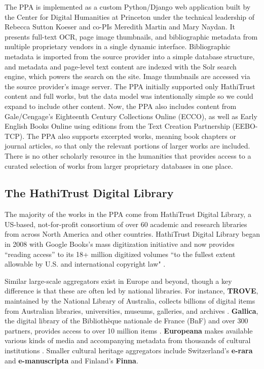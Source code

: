 \documentclass{anthology-ch}         %
\begin{document}
The PPA is implemented as a custom Python/Django web application built by the Center for Digital Humanities at Princeton under the technical leadership of Rebecca Sutton Koeser and co-PIs Meredith Martin and Mary Naydan. It presents full-text OCR, page image thumbnails, and bibliographic metadata from multiple proprietary vendors in a single dynamic interface. Bibliographic metadata is imported from the source provider into a simple database structure, and metadata and page-level text content are indexed with the Solr search engine, which powers the search on the site. Image thumbnails are accessed via the source provider’s image server. The PPA initially supported only HathiTrust content and full works, but the data model was intentionally simple so we could expand to include other content. Now, the PPA also includes content from Gale/Cengage’s Eighteenth Century Collections Online (ECCO), as well as Early English Books Online using editions from the Text Creation Partnership (EEBO-TCP). The PPA also supports excerpted works, meaning book chapters or journal articles, so that only the relevant portions of larger works are included. There is no other scholarly resource in the humanities that provides access to a curated selection of works from larger proprietary databases in one place. 

\subsection{The HathiTrust Digital Library}

The majority of the works in the PPA come from HathiTrust Digital Library, a US-based, not-for-profit consortium of over 60 academic and research libraries from across North America and other countries. HathiTrust Digital Library began in 2008 with Google Books’s mass digitization initiative and now provides “reading access” to its 18+ million digitized volumes “to the fullest extent allowable by U.S. and international copyright law" \cite{noauthor_welcome_nodate}.

Similar large-scale aggregators exist in Europe and beyond, though a key difference is that these are often led by national libraries. For instance, \textbf{TROVE}, maintained by the National Library of Australia, collects billions of digital items from Australian libraries, universities, museums, galleries, and archives \cite{noauthor_home_nodate}. \textbf{Gallica}, the digital library of the Bibliothèque nationale de France (BnF) and over 300 partners, provides access to over 10 million items \cite{noauthor_page_nodate}. \textbf{Europeana} makes available various kinds of media and accompanying metadata from thousands of cultural institutions \cite{noauthor_discover_nodate}. Smaller cultural heritage aggregators include Switzerland’s \textbf{e-rara}\cite{noauthor_e-rara_nodate} and \textbf{e-manuscripta}\cite{noauthor_e-manuscripta_nodate} and Finland’s \textbf{Finna}\cite{noauthor_search_nodate}. 
\end{document}
